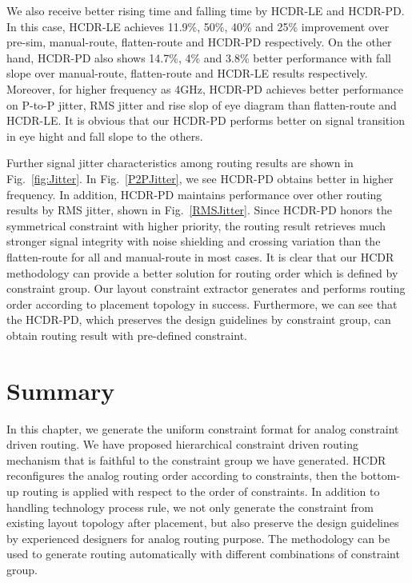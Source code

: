     We also receive better rising time and falling time by HCDR-LE and HCDR-PD. In this case, HCDR-LE achieves 11.9\%, 50\%, 40\% and 25\% improvement over pre-sim, manual-route, flatten-route and HCDR-PD respectively. On the other hand, HCDR-PD also shows 14.7\%, 4\% and 3.8\% better performance with fall slope over manual-route, flatten-route and HCDR-LE results respectively. Moreover, for higher frequency as 4GHz, HCDR-PD achieves better performance on P-to-P jitter, RMS jitter and rise slop of eye diagram than flatten-route and HCDR-LE. It is obvious that our HCDR-PD performs better on signal transition in eye hight and fall slope to the others. 
    
    Further signal jitter characteristics among routing results are shown in Fig.~\ref{fig:Jitter}. In Fig.~\ref{P2PJitter}, we see HCDR-PD obtains better in higher frequency. In addition, HCDR-PD maintains performance over other routing results by RMS jitter, shown in Fig.~\ref{RMSJitter}. Since HCDR-PD honors the symmetrical constraint with higher priority, the routing result retrieves much stronger signal integrity with noise shielding and crossing variation than the flatten-route for all and manual-route in most cases. It is clear that our HCDR methodology can provide a better solution for routing order which is defined by constraint group. Our layout constraint extractor generates and performs routing order according to placement topology in success. Furthermore, we can see that the HCDR-PD, which preserves the design guidelines by constraint group, can obtain routing result with pre-defined constraint.

  \section{Summary}\label{sec:CUCLMSum}

    In this chapter, we generate the uniform constraint format for analog constraint driven routing. We have proposed hierarchical constraint driven routing mechanism that is faithful to the constraint group we have generated. HCDR reconfigures the analog routing order according to constraints, then the bottom-up routing is applied with respect to the order of constraints. In addition to handling technology process rule, we not only generate the constraint from existing layout topology after placement, but also preserve the design guidelines by experienced designers for analog routing purpose. The methodology can be used to generate routing automatically with different combinations of constraint group. 

